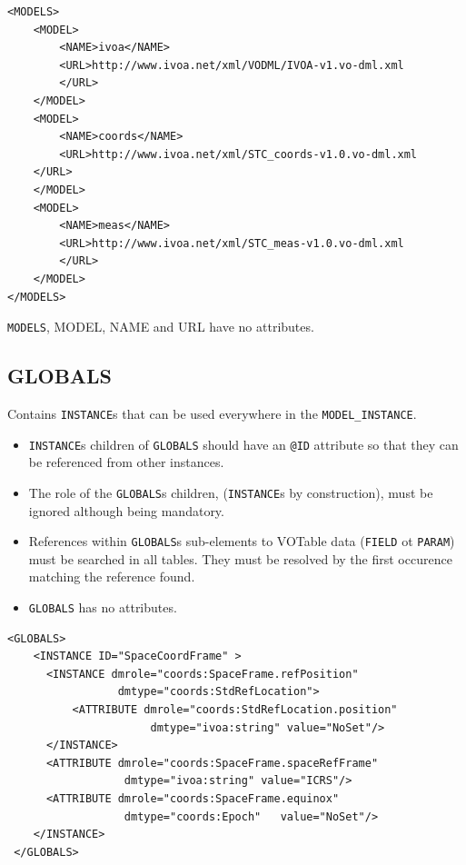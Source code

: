 \documentclass[11pt,a4paper]{ivoa}
\begin{document}
\begin{lstlisting}[caption={GLOBALS block example},style=XML]
<MODELS>
    <MODEL>
        <NAME>ivoa</NAME>
        <URL>http://www.ivoa.net/xml/VODML/IVOA-v1.vo-dml.xml
        </URL>
    </MODEL>
    <MODEL>
        <NAME>coords</NAME>
        <URL>http://www.ivoa.net/xml/STC_coords-v1.0.vo-dml.xml
    </URL>
    </MODEL>
    <MODEL>
        <NAME>meas</NAME>
        <URL>http://www.ivoa.net/xml/STC_meas-v1.0.vo-dml.xml
        </URL>
    </MODEL>
</MODELS>
\end{lstlisting}

 \texttt{MODELS},  {MODEL},  {NAME} and {URL}  have no attributes. 
 

%
%

\subsection{GLOBALS}
 Contains  \texttt{INSTANCE}s  that can be used everywhere in the \texttt{MODEL\_INSTANCE}.

\begin{itemize}
    \item \texttt{INSTANCE}s children of \texttt{GLOBALS} should have an  \texttt{@ID} attribute so that they can be referenced from other instances.
    \item The role of the \texttt{GLOBALS}s children, (\texttt{INSTANCE}s by construction), must be ignored although being mandatory.
    \item References within \texttt{GLOBALS}s  sub-elements to VOTable data (\texttt{FIELD} ot \texttt{PARAM}) must be searched in all tables. 
            They must be resolved by the first occurence matching the reference found.
    \item \texttt{GLOBALS} has no attributes. 
\end{itemize}

\begin{lstlisting}[caption={GLOBALS block example},style=XML]
  <GLOBALS>
    <INSTANCE ID="SpaceCoordFrame" >
      <INSTANCE dmrole="coords:SpaceFrame.refPosition" 
                 dmtype="coords:StdRefLocation">
          <ATTRIBUTE dmrole="coords:StdRefLocation.position" 
                      dmtype="ivoa:string" value="NoSet"/>
      </INSTANCE>
      <ATTRIBUTE dmrole="coords:SpaceFrame.spaceRefFrame" 
                  dmtype="ivoa:string" value="ICRS"/>
      <ATTRIBUTE dmrole="coords:SpaceFrame.equinox" 
                  dmtype="coords:Epoch"   value="NoSet"/>
    </INSTANCE>
 </GLOBALS>
\end{lstlisting}
\end{document}
